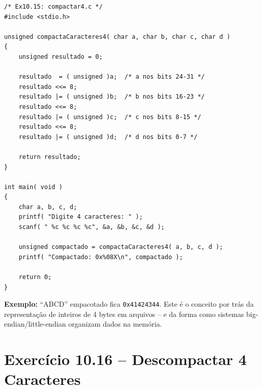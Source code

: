 \documentclass[12pt,a4paper]{article}
\begin{document}
\begin{respostabox}
\begin{lstlisting}
/* Ex10.15: compactar4.c */
#include <stdio.h>

unsigned compactaCaracteres4( char a, char b, char c, char d )
{
    unsigned resultado = 0;

    resultado  = ( unsigned )a;  /* a nos bits 24-31 */
    resultado <<= 8;
    resultado |= ( unsigned )b;  /* b nos bits 16-23 */
    resultado <<= 8;
    resultado |= ( unsigned )c;  /* c nos bits 8-15 */
    resultado <<= 8;
    resultado |= ( unsigned )d;  /* d nos bits 0-7 */

    return resultado;
}

int main( void )
{
    char a, b, c, d;
    printf( "Digite 4 caracteres: " );
    scanf( " %c %c %c %c", &a, &b, &c, &d );

    unsigned compactado = compactaCaracteres4( a, b, c, d );
    printf( "Compactado: 0x%08X\n", compactado );

    return 0;
}
\end{lstlisting}

\textbf{Exemplo:} ``ABCD'' empacotado fica \texttt{0x41424344}. Este é o conceito
por trás da representação de inteiros de 4 bytes em arquivos -- e da forma como
sistemas big-endian/little-endian organizam dados na memória.
\end{respostabox}

\newpage

\section{Exercício 10.16 -- Descompactar 4 Caracteres}
\end{document}
